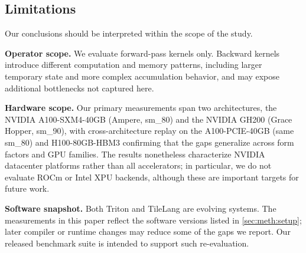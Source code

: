 \subsection{Limitations}
\label{sec:disc:limitations}





Our conclusions should be interpreted within the scope of the study.

\textbf{Operator scope.}
We evaluate forward-pass kernels only. Backward kernels introduce different computation and memory patterns, including larger temporary state and more complex accumulation behavior, and may expose additional bottlenecks not captured here.

\textbf{Hardware scope.}
Our primary measurements span two architectures, the NVIDIA A100-SXM4-40GB (Ampere, sm\_80) and the NVIDIA GH200 (Grace Hopper, sm\_90), with cross-architecture replay on the A100-PCIE-40GB (same sm\_80) and H100-80GB-HBM3 confirming that the gaps generalize across form factors and GPU families. The results nonetheless characterize NVIDIA datacenter platforms rather than all accelerators; in particular, we do not evaluate ROCm or Intel XPU backends, although these are important targets for future work.

\textbf{Software snapshot.}
Both Triton and TileLang are evolving systems. The measurements in this paper reflect the software versions listed in \cref{sec:meth:setup}; later compiler or runtime changes may reduce some of the gaps we report. Our released benchmark suite is intended to support such re-evaluation.